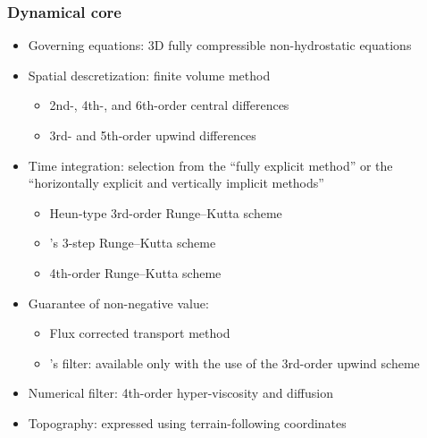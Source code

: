\subsubsection{Dynamical core}
\begin{itemize}
 \item Governing equations: 3D fully compressible non-hydrostatic equations
 \item Spatial descretization: finite volume method
    \begin{itemize}
      \item 2nd-, 4th-, and 6th-order central differences
      \item 3rd- and 5th-order upwind differences
    \end{itemize}
 \item Time integration: selection from the ``fully explicit method'' 
   or the ``horizontally explicit and vertically implicit methods''
    \begin{itemize}
      \item Heun-type 3rd-order Runge--Kutta scheme
      \item \citet{Wicker_2002}'s 3-step Runge--Kutta scheme
      \item 4th-order Runge--Kutta scheme
    \end{itemize}
 \item Guarantee of non-negative value:
    \begin{itemize}
      \item Flux corrected transport method \citep{zalesak_1979}
      \item \citet{Koren_1993}'s filter: available only with the use of the 3rd-order upwind scheme
    \end{itemize}
 \item Numerical filter: 4th-order hyper-viscosity and diffusion
 \item Topography: expressed using terrain-following coordinates
\end{itemize}


